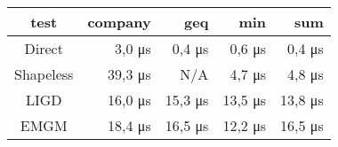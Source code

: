 \begin{tabular}{c|r|r|r|r}
\bf{test}  & \bf{company}    & \bf{geq}        & \bf{min}        & \bf{sum}       \\
\hline
Direct     &          3,0 μs &          0,4 μs &          0,6 μs &          0,4 μs\\
Shapeless  &         39,3 μs &             N/A &          4,7 μs &          4,8 μs\\
LIGD       &         16,0 μs &         15,3 μs &         13,5 μs &         13,8 μs\\
EMGM       &         18,4 μs &         16,5 μs &         12,2 μs &         16,5 μs\\
\end{tabular}
